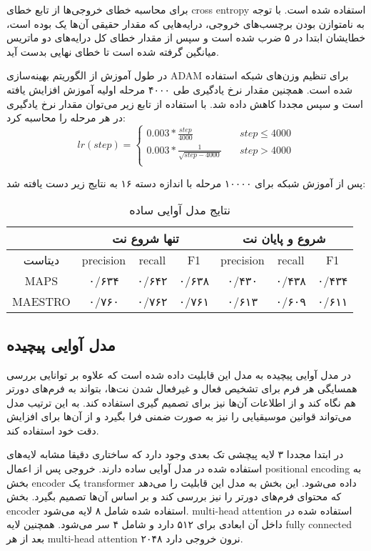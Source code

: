 برای محاسبه خطای خروجی‌ها از تابع خطای \gls{cross entropy} استفاده شده است. با
توجه به نامتوازن بودن برچسب‌های خروجی، درایه‌هایی که مقدار حقیقی آن‌ها یک بوده
است، خطایشان ابتدا در ۵ ضرب شده است و سپس از مقدار خطای کل درایه‌های دو ماتریس
میانگین گرفته شده است تا خطای نهایی بدست آید.

در طول آموزش از الگوریتم بهینه‌سازی ADAM برای تنظیم وزن‌های شبکه استفاده شده
است. همچنین مقدار نرخ یادگیری طی ۴۰۰۰ مرحله اولیه آموزش افزایش یافته است و سپس
مجددا کاهش داده شد. با استفاده از تابع زیر می‌توان مقدار نرخ یادگیری در هر مرحله
را محاسبه کرد:
\begin{equation}
    lr(step) =
    \begin{cases}
        0.003 * \frac{step}{4000} &\quad step \leq 4000\\
        0.003 * \frac{1}{\sqrt{step - 4000}} &\quad step > 4000\\
    \end{cases}
\end{equation}

پس از آموزش شبکه برای ۱۰۰۰۰ مرحله با اندازه دسته ۱۶ به نتایج زیر دست یافته شد:
\begin{table}[ht]
    \centering
    \begin{tabular}{|c|c|c|c|c|c|c|}
        \hline
        & \multicolumn{3}{|c|}{تنها شروع نت} & \multicolumn{3}{|c|}{شروع و پایان نت} \\
        \hline
        دیتاست & \gls{precision} & \gls{recall} & F1 & \gls{precision} & \gls{recall} & F1 \\
        \hline
        MAPS & ۰/۶۳۴ & ۰/۶۴۲ & ۰/۶۳۸ & ۰/۴۳۰ & ۰/۴۳۸ & ۰/۴۳۴ \\
        \hline
        MAESTRO & ۰/۷۶۰ & ۰/۷۶۲ & ۰/۷۶۱ & ۰/۶۱۳ & ۰/۶۰۹ & ۰/۶۱۱ \\
        \hline
    \end{tabular}
    \caption{نتایج مدل آوایی ساده}
\end{table}

\subsection{مدل آوایی پیچیده}
در مدل آوایی پیچیده به مدل این قابلیت داده شده است که علاوه بر توانایی بررسی
همسایگی هر فرم برای تشخیص فعال و غیرفعال شدن نت‌ها، بتواند به فرم‌های دورتر هم
نگاه کند و از اطلاعات آن‌ها نیز برای تصمیم گیری استفاده کند. به این ترتیب مدل
می‌تواند قوانین موسیقیایی را نیز به صورت ضمنی فرا بگیرد و از آن‌ها برای افزایش
دقت خود استفاده کند.

در ابتدا مجددا ۳ لایه پیچشی تک بعدی وجود دارد که ساختاری دقیقا مشابه لایه‌های
استفاده شده در مدل آوایی ساده دارند. خروجی پس از اعمال \gls{positional encoding}
به بخش \gls{encoder} یک \gls{transformer} داده می‌شود. این بخش به مدل این قابلیت
را می‌دهد که محتوای فرم‌های دورتر را نیز بررسی کند و بر اساس آن‌ها تصمیم بگیرد.
بخش \gls{encoder} استفاده شده شامل ۸ لایه می‌شود. \gls{multi-head attention}
استفاده شده در داخل آن ابعادی برای ۵۱۲ دارد و شامل ۴ سر می‌شود. همچنین لایه
\gls{fully connected} بعد از هر \gls{multi-head attention} ۲۰۴۸ نرون خروجی دارد.

